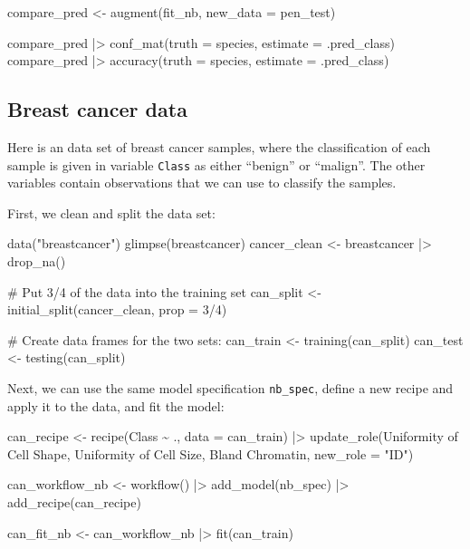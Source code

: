 \documentclass[
  letterpaper,
  DIV=11,
  numbers=noendperiod]{scrreprt}
\newenvironment{Shaded}{\begin{snugshade}}{\end{snugshade}}
\newcommand{\NormalTok}[1]{\textcolor[rgb]{0.00,0.23,0.31}{#1}}
\begin{document}
\begin{Shaded}
\begin{Highlighting}[]
\NormalTok{compare\_pred \textless{}{-} augment(fit\_nb, new\_data = pen\_test) }

\NormalTok{compare\_pred |\textgreater{} conf\_mat(truth = species, estimate = .pred\_class)}
\NormalTok{compare\_pred |\textgreater{} accuracy(truth = species, estimate = .pred\_class)}
\end{Highlighting}
\end{Shaded}

\subsection{Breast cancer data}\label{breast-cancer-data}

Here is an data set of breast cancer samples, where the classification
of each sample is given in variable \texttt{Class} as either ``benign''
or ``malign''. The other variables contain observations that we can use
to classify the samples.

First, we clean and split the data set:

\begin{Shaded}
\begin{Highlighting}[]
\NormalTok{data("breastcancer")}
\NormalTok{glimpse(breastcancer)}
\NormalTok{cancer\_clean \textless{}{-} breastcancer |\textgreater{} drop\_na()}

\NormalTok{\# Put 3/4 of the data into the training set }
\NormalTok{can\_split \textless{}{-} initial\_split(cancer\_clean, prop = 3/4)}

\NormalTok{\# Create data frames for the two sets:}
\NormalTok{can\_train \textless{}{-} training(can\_split)}
\NormalTok{can\_test  \textless{}{-} testing(can\_split)}
\end{Highlighting}
\end{Shaded}

Next, we can use the same model specification \texttt{nb\_spec}, define
a new recipe and apply it to the data, and fit the model:

\begin{Shaded}
\begin{Highlighting}[]
\NormalTok{can\_recipe \textless{}{-} }
\NormalTok{  recipe(Class \textasciitilde{} ., data = can\_train) |\textgreater{} }
\NormalTok{  update\_role(\textasciigrave{}Uniformity of Cell Shape\textasciigrave{},  \textasciigrave{}Uniformity of Cell Size\textasciigrave{}, \textasciigrave{}Bland Chromatin\textasciigrave{}, new\_role = "ID")}
  

\NormalTok{can\_workflow\_nb \textless{}{-} workflow() |\textgreater{}}
\NormalTok{  add\_model(nb\_spec) |\textgreater{}}
\NormalTok{  add\_recipe(can\_recipe)}

\NormalTok{can\_fit\_nb \textless{}{-} can\_workflow\_nb |\textgreater{} fit(can\_train)}
\end{Highlighting}
\end{Shaded}
\end{document}
